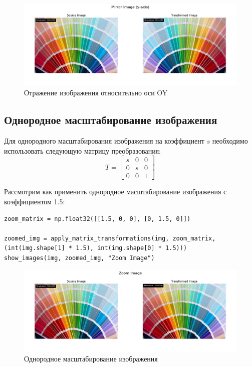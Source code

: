 \begin{figure}[ht]
    \includegraphics[width=\textwidth]{../results/Mirror Image (y-axis).png}
    \caption{Отражение изображения относительно оси OY}
    \label{fig:mirror_image_Y}
\end{figure}

\subsection{Однородное масштабирование изображения}

Для однородного масштабирования изображения на коэффициент $s$ необходимо использовать следующую матрицу преобразования:
\begin{equation}
T = \begin{bmatrix}
    s & 0 & 0 \\
    0 & s & 0 \\
    0 & 0 & 1
\end{bmatrix}
\end{equation}

Рассмотрим как применить однородное масштабирование изображения с коэффициентом 1.5:
\begin{lstlisting}[style=python_white, caption={Исходный код для однородного масштабирования изображения}]
zoom_matrix = np.float32([[1.5, 0, 0], [0, 1.5, 0]])

zoomed_img = apply_matrix_transformations(img, zoom_matrix, (int(img.shape[1] * 1.5), int(img.shape[0] * 1.5)))
show_images(img, zoomed_img, "Zoom Image")
\end{lstlisting}

\begin{figure}[ht]
    \includegraphics[width=\textwidth]{../results/Zoom Image.png}
    \caption{Однородное масштабирование изображения}
    \label{fig:uniform_scale_image}
\end{figure}

